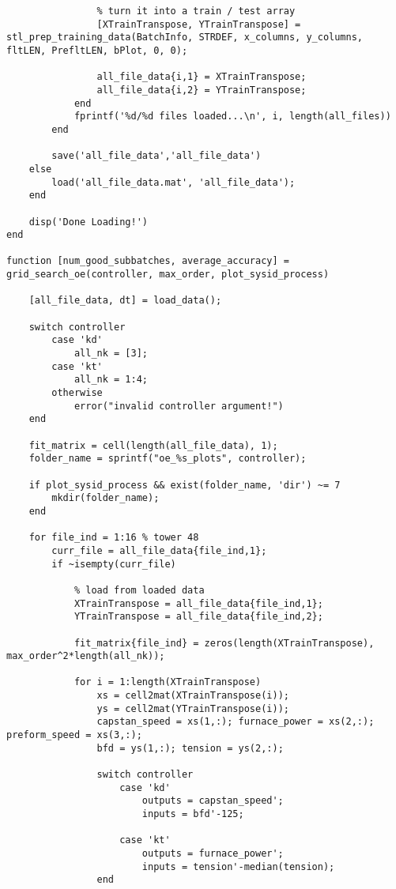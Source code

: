 \begin{lstlisting}
                % turn it into a train / test array
                [XTrainTranspose, YTrainTranspose] = stl_prep_training_data(BatchInfo, STRDEF, x_columns, y_columns, fltLEN, PrefltLEN, bPlot, 0, 0);
    
                all_file_data{i,1} = XTrainTranspose;
                all_file_data{i,2} = YTrainTranspose;
            end
            fprintf('%d/%d files loaded...\n', i, length(all_files))
        end
    
        save('all_file_data','all_file_data')
    else
        load('all_file_data.mat', 'all_file_data');
    end
    
    disp('Done Loading!')
end

function [num_good_subbatches, average_accuracy] = grid_search_oe(controller, max_order, plot_sysid_process)

    [all_file_data, dt] = load_data();
    
    switch controller
        case 'kd'
            all_nk = [3];
        case 'kt'
            all_nk = 1:4;
        otherwise
            error("invalid controller argument!")
    end
    
    fit_matrix = cell(length(all_file_data), 1);
    folder_name = sprintf("oe_%s_plots", controller);
    
    if plot_sysid_process && exist(folder_name, 'dir') ~= 7
        mkdir(folder_name);
    end
    
    for file_ind = 1:16 % tower 48
        curr_file = all_file_data{file_ind,1};
        if ~isempty(curr_file)
    
            % load from loaded data
            XTrainTranspose = all_file_data{file_ind,1};
            YTrainTranspose = all_file_data{file_ind,2};
    
            fit_matrix{file_ind} = zeros(length(XTrainTranspose), max_order^2*length(all_nk));
    
            for i = 1:length(XTrainTranspose)
                xs = cell2mat(XTrainTranspose(i));
                ys = cell2mat(YTrainTranspose(i));
                capstan_speed = xs(1,:); furnace_power = xs(2,:); preform_speed = xs(3,:);
                bfd = ys(1,:); tension = ys(2,:);
    
                switch controller
                    case 'kd'
                        outputs = capstan_speed';
                        inputs = bfd'-125;
    
                    case 'kt'
                        outputs = furnace_power';
                        inputs = tension'-median(tension);
                end
    

\end{lstlisting}
